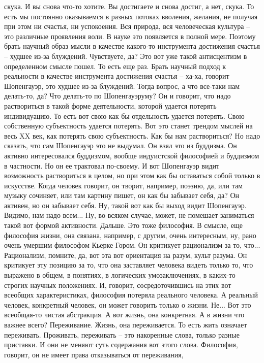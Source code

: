 скука. И вы снова что-то хотите. Вы достигаете и снова достиг, а нет, скука. То
есть мы постоянно оказываемся в разных потоках вволения, желания, не получая при
этом ни счастья, ни успокоения. Вся природа, вся человеческая культура – это
различные проявления воли. В науке это появляется в полной мере. Поэтому брать
научный образ мысли в качестве какого-то инструмента достижения счастья – худшее
из-за блуждений. Чувствуете, да? Это вот уже такой антисцентизм в определенном
смысле пошел. То есть еще раз. Брать научный подход к реальности в качестве
инструмента достижения счастья – ха-ха, говорит Шопенгауэр, это худшее из-за
блуждений. Тогда вопрос, а что все-таки нам делать-то, да? Что делать-то по
Шопенгауэруму? Он и говорит, что надо раствориться в такой форме деятельности,
которой удается потерять индивидуацию. То есть вот свою как бы отдельность
удается потерять. Свою собственную субъектность удается потерять. Вот это станет
трендом мыслей на весь XX век, как потерять свою субъектность. Как бы нам
раствориться? Но надо сказать, что сам Шопенгауэр это не выдумал. Он взял это из
буддизма. Он активно интересовался буддизмом, вообще индуистской философией и
буддизмом в частности. Но он ее трактовал по-своему. И вот Шопенгауэр видит
возможность раствориться в целом, но при этом как бы оставаться собой только в
искусстве. Когда человек говорит, он творит, например, поэзию, да, или там
музыку сочиняет, или там картину пишет, он как бы забывает себя, да? Он активен,
но он забывает себя. Ну, такой вот как бы выход видит Шопенгауэр. Видимо, нам
надо всем... Ну, во всяком случае, может, не помешает заниматься такой вот
формой активности. Дальше. Это тоже философия. В смысле, еще философия жизни,
она связана, например, с другим, очень интересным, ну, рано очень умершим
философом Кьерке Гором. Он критикует рационализм за то, что... Рационализм,
помните, да, вот эта вот ориентация на разум, культ разума. Он критикует эту
позицию за то, что она заставляет человека видеть только то, что выражено в
общем, в понятиях, в логических умозаключениях, в каких-то строгих научных
положениях. И, говорит, сосредоточившись на этих вот всеобщих характеристиках,
философия потеряла реального человека. А реальный человек, конкретный человек,
он может говорить только о жизни. Не... Вот это всеобщая-то чистая абстракция. А
вот жизнь, она конкретная. А в жизни что важнее всего? Переживание. Жизнь, она
переживается. То есть жить означает переживать. Проживать, переживать – это
накоренные слова, только разные приставки. И они не меняют суть содержания вот
этого слова. Философия, говорит, он не имеет права отказываться от переживания,
